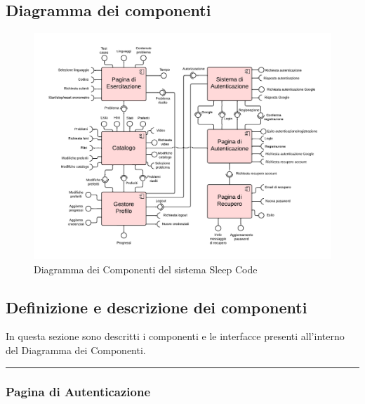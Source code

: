 \documentclass[11pt, a4paper]{article}
\theoremstyle{definition} %
\begin{document}
\subsection{Diagramma dei componenti}
\begin{figure}[H]
\centering
\hspace*{-3cm}
\includegraphics[scale = 0.86]{materiale/componentdiagram.pdf}
\caption{Diagramma dei Componenti del sistema Sleep Code}
\label{compdiagram}
\end{figure}

\newpage
\subsection{Definizione e descrizione dei componenti}
In questa sezione sono descritti i componenti e le interfacce presenti
all'interno del Diagramma dei Componenti.

\begin{center}
    \rule{5cm}{1pt}
\end{center}

\subsubsection{Pagina di Autenticazione}
\end{document}
